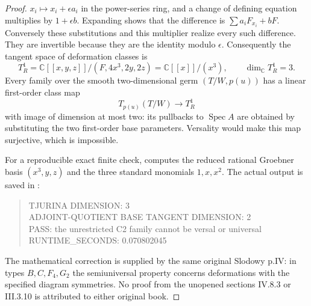 \begin{proof}
$x_i\mapsto x_i+\epsilon a_i$ in the power-series ring,
and a change of defining equation multiplies by
$1+\epsilon b$.  Expanding shows that the difference
is $\sum a_iF_{x_i}+bF$.  Conversely these substitutions
and this multiplier realize every such difference.
They are invertible because they are the identity
modulo $\epsilon$.
Consequently the tangent space of deformation classes is
\[
 T^1_R=
 \mathbb C[[x,y,z]]/(F,4x^3,2y,2z)
 =\mathbb C[[x]]/(x^3),
 \qquad \dim_{\mathbb C}T^1_R=3 .
\]
Every family over the smooth two-dimensional germ
$(T/W,p(u))$ has a linear first-order class map
\[
 T_{p(u)}(T/W)\longrightarrow T^1_R
\]
with image of dimension at most two: its pullbacks to
$\operatorname{Spec}A$ are obtained by substituting the
two first-order base parameters.  Versality would make
this map surjective, which is impossible.

For a reproducible exact finite check,
computes the reduced rational Groebner basis
$(x^3,y,z)$ and the three standard monomials
$1,x,x^2$.  The actual output is saved in
:
\begin{quote}\ttfamily\small
TJURINA DIMENSION: 3\\
ADJOINT-QUOTIENT BASE TANGENT DIMENSION: 2\\
PASS: the unrestricted C2 family cannot be versal or universal\\
RUNTIME\_SECONDS: 0.070802045
\end{quote}
The mathematical correction is supplied by the same
original Slodowy p.IV: in types $B,C,F_4,G_2$ the
semiuniversal property concerns deformations with the
specified diagram symmetries.  No proof from the
unopened sections IV.8.3 or III.3.10 is attributed to
either original book.
\end{proof}
